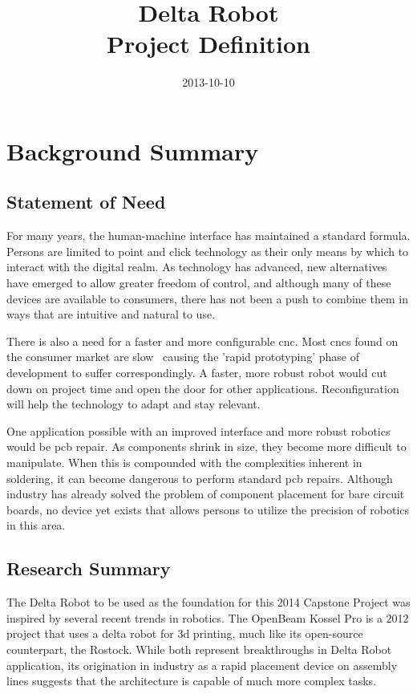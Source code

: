 


\date{2013-10-10}
\title{Delta Robot \\ Project Definition}


\maketitle
\tableofcontents
\tableoffiguresandtables

\chapter{Background Summary}
\section{Statement of Need}
For many years, the human-machine interface has maintained a standard formula.
Persons are limited to point and click technology as their only means by which to interact with the digital realm.
As technology has advanced, new alternatives have emerged to allow  greater freedom of control, and although many of these devices are available to consumers, there has not been a push to combine them in ways that are intuitive and natural to use.

There is also a need for a faster and more configurable \gls{cnc}.
Most \gls{cnc}s found on the consumer market are slow~ causing the 'rapid prototyping' phase of development to suffer correspondingly.
A faster, more robust robot would cut down on project time and open the door for other applications.
Reconfiguration will help the technology to adapt and stay relevant.

One application possible with an improved interface and more robust robotics would be \gls{pcb} repair.
As components shrink in size, they become more difficult to manipulate.
When this is compounded with the complexities inherent in soldering, it can become dangerous to perform standard \gls{pcb} repairs.
Although industry has already solved the problem of component placement for bare circuit boards, no device yet exists that allows persons to utilize the precision of robotics in this area. 

\section{Research Summary}
The Delta Robot to be used as the foundation for this 2014 Capstone Project was inspired by several recent trends in robotics.
The OpenBeam Kossel Pro is a 2012 project that uses a delta robot for \gls{3d} printing, much like its open-source counterpart, the Rostock.
While both represent breakthroughs in Delta Robot application, its origination in industry as a rapid placement device on assembly lines suggests that the architecture is capable of much more complex tasks.

